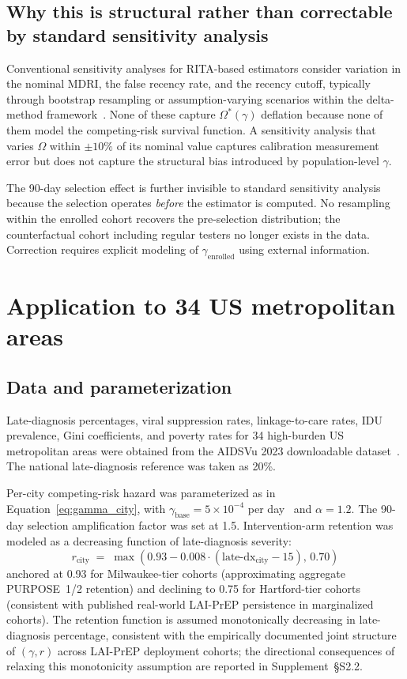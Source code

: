 \documentclass[11pt]{article}
\begin{document}
\subsection{Why this is structural rather than correctable by standard sensitivity analysis}

Conventional sensitivity analyses for RITA-based estimators consider variation in the nominal MDRI, the false recency rate, and the recency cutoff, typically through bootstrap resampling or assumption-varying scenarios within the delta-method framework~\cite{gao2021}. None of these capture $\Omega^*(\gamma)$ deflation because none of them model the competing-risk survival function. A sensitivity analysis that varies $\Omega$ within $\pm 10\%$ of its nominal value captures calibration measurement error but does not capture the structural bias introduced by population-level $\gamma$.

The 90-day selection effect is further invisible to standard sensitivity analysis because the selection operates \emph{before} the estimator is computed. No resampling within the enrolled cohort recovers the pre-selection distribution; the counterfactual cohort including regular testers no longer exists in the data. Correction requires explicit modeling of $\gamma_{\mathrm{enrolled}}$ using external information.

\section{Application to 34 US metropolitan areas}\label{sec:results}

\subsection{Data and parameterization}

Late-diagnosis percentages, viral suppression rates, linkage-to-care rates, IDU prevalence, Gini coefficients, and poverty rates for 34 high-burden US metropolitan areas were obtained from the AIDSVu 2023 downloadable dataset~\cite{aidsvu2023}. The national late-diagnosis reference was taken as 20\%.

Per-city competing-risk hazard was parameterized as in Equation~\ref{eq:gamma_city}, with $\gamma_{\mathrm{base}} = 5 \times 10^{-4}$ per day~\cite{nhbs2023,cdcatp2023,bjs2023} and $\alpha = 1.2$. The 90-day selection amplification factor was set at 1.5. Intervention-arm retention was modeled as a decreasing function of late-diagnosis severity:
\begin{equation}
r_{\mathrm{city}} \;=\; \max(0.93 - 0.008 \cdot (\text{late-dx}_{\mathrm{city}} - 15),\, 0.70) \label{eq:retention}
\end{equation}
anchored at 0.93 for Milwaukee-tier cohorts (approximating aggregate PURPOSE~1/2 retention) and declining to 0.75 for Hartford-tier cohorts (consistent with published real-world LAI-PrEP persistence in marginalized cohorts). The retention function is assumed monotonically decreasing in late-diagnosis percentage, consistent with the empirically documented joint structure of $(\gamma, r)$ across LAI-PrEP deployment cohorts; the directional consequences of relaxing this monotonicity assumption are reported in Supplement~\S S2.2.
\end{document}
